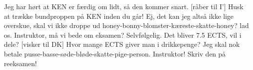 \documentclass[a4paper,11pt]{article}
\begin{document}
\begin{sketch}

 Jeg har hørt at KEN er færdig om lidt, så den kommer snart.
[råber til I'] Husk at trække bundproppen på KEN inden du går!
 Ej, det kan jeg altså ikke lige overskue, skal vi ikke droppe ud
honey-bonny-blomster-kæreste-skatte-honey?
 lad os. Instruktor, må vi bede om eksamen?
 Selvfølgelig. Det bliver 7.5 ECTS, vil i dele?
[visker til DK] Hvor mange ECTS giver man i drikkepenge?
 
          Jeg skal nok betale pusse-basse-søde-bløde-skatte-pige-person.
          Instruktor! Skriv den på reeksamen!





\end{sketch}
\end{document}
